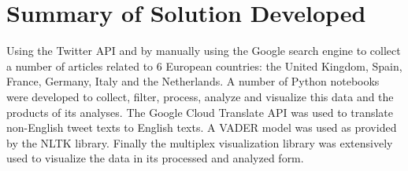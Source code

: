 %
%

\section{Summary of Solution Developed}
Using the Twitter \ac{API}\citep{roesslein2020tweepy} and by manually using the Google search engine to collect a number of articles related to 6 European countries: the United Kingdom, Spain, France, Germany, Italy and the Netherlands.
A number of Python notebooks were developed to collect, filter, process, analyze and visualize this data and the products of its analyses.
The Google Cloud Translate \ac{API} was used to translate non-English tweet texts to English texts.
A \ac{VADER} model was used as provided by the \ac{NLTK} library\citep{bird2009natural}.
Finally the multiplex visualization library\citep{Mamo2021} was extensively used to visualize the data in its processed and analyzed form.

%
%


%
%



